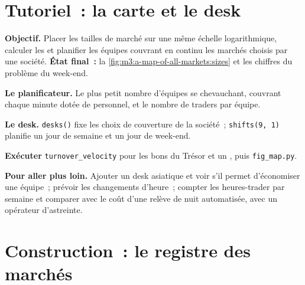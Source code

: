 \section{Tutoriel~: la carte et le desk}\label{tut:m3:a-map-of-all-markets:map}

\begin{tutorial}
\textbf{Objectif.} Placer les tailles de marché sur une même échelle logarithmique, calculer les  et planifier les équipes couvrant en continu les marchés choisis par une société.
\textbf{État final~:} la \cref{fig:m3:a-map-of-all-markets:sizes} et les chiffres du problème du week-end.
\begin{tutsteps}
\item \textbf{Le planificateur.} Le plus petit nombre d'équipes se chevauchant, couvrant chaque minute dotée de personnel, et le nombre de traders par équipe.
\label{lst:m3:a-map-of-all-markets:shifts}
\item \textbf{Le desk.} \texttt{desks()} fixe les choix de couverture de la société~; \texttt{shifts(9, 1)} planifie un jour de semaine et un jour de week-end.
\item \textbf{Exécuter} \texttt{turnover\_velocity} pour les bons du Trésor et un , puis \texttt{fig\_map.py}.
\end{tutsteps}
\textbf{Pour aller plus loin.} Ajouter un desk asiatique et voir s'il permet d'économiser une équipe~; prévoir les changements d'heure~; compter les heures-trader par semaine et comparer avec
le coût d'une relève de nuit automatisée, avec un opérateur d'astreinte.
\end{tutorial}

\section{Construction~: le registre des marchés}\label{bld:m3:a-map-of-all-markets:marketmap}

